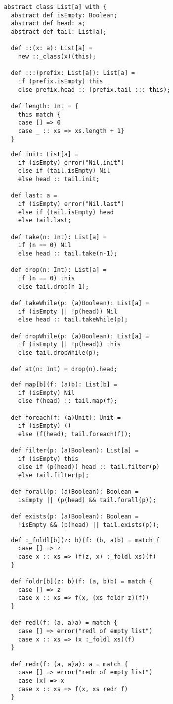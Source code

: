 \documentclass[11pt]{report}
\begin{document}
\begin{verbatim}
abstract class List[a] with {
  abstract def isEmpty: Boolean;
  abstract def head: a;
  abstract def tail: List[a];

  def ::(x: a): List[a] =
    new ::_class(x)(this);

  def :::(prefix: List[a]): List[a] =
    if (prefix.isEmpty) this
    else prefix.head :: (prefix.tail ::: this);

  def length: Int = {
    this match {
	case [] => 0
    case _ :: xs => xs.length + 1}
  }
\end{verbatim}
\begin{verbatim}
  def init: List[a] =
    if (isEmpty) error("Nil.init")
    else if (tail.isEmpty) Nil
    else head :: tail.init;

  def last: a =
    if (isEmpty) error("Nil.last")
    else if (tail.isEmpty) head
    else tail.last;

  def take(n: Int): List[a] =
    if (n == 0) Nil
    else head :: tail.take(n-1);

  def drop(n: Int): List[a] =
    if (n == 0) this
    else tail.drop(n-1);

  def takeWhile(p: (a)Boolean): List[a] =
    if (isEmpty || !p(head)) Nil
    else head :: tail.takeWhile(p);

  def dropWhile(p: (a)Boolean): List[a] =
    if (isEmpty || !p(head)) this
    else tail.dropWhile(p);

  def at(n: Int) = drop(n).head;
\end{verbatim}
\begin{verbatim}
  def map[b](f: (a)b): List[b] =
    if (isEmpty) Nil
    else f(head) :: tail.map(f);

  def foreach(f: (a)Unit): Unit =
    if (isEmpty) ()
    else (f(head); tail.foreach(f));

  def filter(p: (a)Boolean): List[a] =
    if (isEmpty) this
    else if (p(head)) head :: tail.filter(p)
    else tail.filter(p);

  def forall(p: (a)Boolean): Boolean =
    isEmpty || (p(head) && tail.forall(p));

  def exists(p: (a)Boolean): Boolean =
    !isEmpty && (p(head) || tail.exists(p));
\end{verbatim}
\begin{verbatim}
  def :_foldl[b](z: b)(f: (b, a)b) = match {
    case [] => z
    case x :: xs => (f(z, x) :_foldl xs)(f)
  }

  def foldr[b](z: b)(f: (a, b)b) = match {
    case [] => z
    case x :: xs => f(x, (xs foldr z)(f))
  }

  def redl(f: (a, a)a) = match {
    case [] => error("redl of empty list")
    case x :: xs => (x :_foldl xs)(f)
  }

  def redr(f: (a, a)a): a = match {
	case [] => error("redr of empty list")
	case [x] => x
	case x :: xs => f(x, xs redr f)
  }
\end{verbatim}
\end{document}
